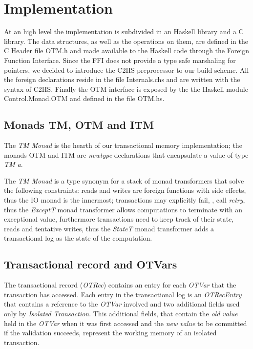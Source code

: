 
\chapter{Implementation}

At an high level the implementation is subdivided in an Haskell library and a C library.
The data structures, as well as the operations on them, are defined in the C Header file OTM.h and made available to the Haskell code through the Foreign Function Interface.
Since the FFI does not provide a type safe marshaling for pointers, we decided to introduce the C2HS preprocessor to our build scheme.
All the foreign declarations reside in the file Internals.chs and are written with the syntax of C2HS.\cite{Chakravarty2000}
Finally the OTM interface is exposed by the the Haskell module Control.Monad.OTM and defined in the file OTM.hs.

\section{Monads TM, OTM and ITM}

The \emph{TM Monad} is the hearth of our transactional memory implementation;
the monads OTM and ITM are \emph{newtype} declarations that encapsulate a value of type \emph{TM a}.

The \emph{TM Monad} is a type synonym for a stack of monad transformers that solve the following constraints:
reads and writes are foreign functions with side effects, thus the IO monad is the innermost;
transactions may explicitly fail, \ie, call \emph{retry}, thus the \emph{ExceptT} monad transformer allows computations to terminate with an exceptional value,
furthermore transactions need to keep track of their state, reads and tentative writes, thus the \emph{StateT} monad transformer adds a transactional log as the state of the computation.

\section{Transactional record and OTVars}

The transactional record (\emph{OTRec}) contains an entry for each \emph{OTVar} that the transaction has accessed.
Each entry in the transactional log is an \emph{OTRecEntry} that contains a reference to the \emph{OTVar} involved and two additional fields used only by \emph{Isolated Transaction}.
This additional fields, that contain the \emph{old value} held in the \emph{OTVar} when it was first accessed and the \emph{new value} to be committed if the validation succeeds, represent the working memory of an isolated transaction.

